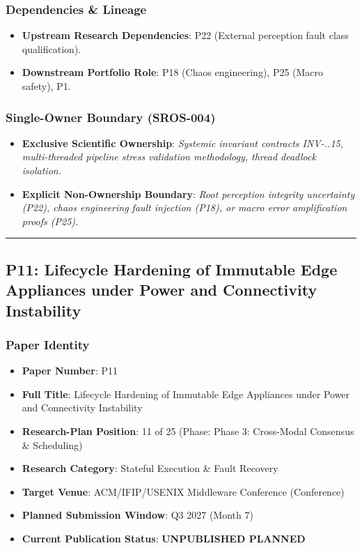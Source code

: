 \documentclass[11pt,letterpaper]{article}
\begin{document}
\subsubsection{Dependencies \& Lineage}
\begin{itemize}[leftmargin=*]
    \item \textbf{Upstream Research Dependencies}: P22 (External perception fault class qualification).
    \item \textbf{Downstream Portfolio Role}: P18 (Chaos engineering), P25 (Macro safety), P1.
\end{itemize}

\subsubsection{Single-Owner Boundary (SROS-004)}
\begin{itemize}[leftmargin=*]
    \item \textbf{Exclusive Scientific Ownership}: \textit{Systemic invariant contracts INV-..15, multi-\allowbreak threaded pipeline stress validation methodology, thread deadlock isolation.}
    \item \textbf{Explicit Non-Ownership Boundary}: \textit{Root perception integrity uncertainty (P22), chaos engineering fault injection (P18), or macro error amplification proofs (P25).}
\end{itemize}

\vspace{0.4cm}
\hrule

\subsection{P11: Lifecycle Hardening of Immutable Edge Appliances under Power and Connectivity Instability}
\label{sec:profile_p11}

\subsubsection{Paper Identity}
\begin{itemize}[leftmargin=*]
    \item \textbf{Paper Number}: P11
    \item \textbf{Full Title}: Lifecycle Hardening of Immutable Edge Appliances under Power and Connectivity Instability
    \item \textbf{Research-Plan Position}: 11 of 25 (Phase: Phase 3: Cross-\allowbreak Modal Consensus \& Scheduling)
    \item \textbf{Research Category}: Stateful Execution \& Fault Recovery
    \item \textbf{Target Venue}: ACM/\allowbreak IFIP/\allowbreak USENIX Middleware Conference (Conference)
    \item \textbf{Planned Submission Window}: Q3 2027 (Month 7)
    \item \textbf{Current Publication Status}: \textbf{UNPUBLISHED PLANNED}
\end{itemize}
\end{document}
